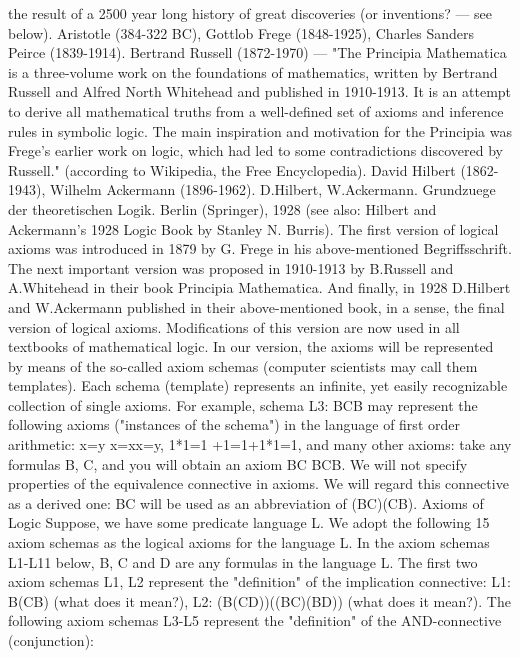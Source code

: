 the result of a 2500 year long history of great discoveries (or inventions? --- see below).
Aristotle (384-322 BC), Gottlob Frege (1848-1925), Charles Sanders Peirce (1839-1914).
Bertrand Russell (1872-1970) --- "The Principia Mathematica is a three-volume work on the foundations of mathematics,
written by Bertrand Russell and Alfred North Whitehead and published in 1910-1913. It is an attempt to derive all
mathematical truths from a well-defined set of axioms and inference rules in symbolic logic. The main inspiration and
motivation for the Principia was Frege's earlier work on logic, which had led to some contradictions discovered by Russell."
(according to Wikipedia, the Free Encyclopedia).
David Hilbert (1862-1943), Wilhelm Ackermann (1896-1962).
D.Hilbert, W.Ackermann. Grundzuege der theoretischen Logik. Berlin (Springer), 1928 (see also: Hilbert and Ackermann's
1928 Logic Book by Stanley N. Burris).
The first version of logical axioms was introduced in 1879 by G. Frege in his above-mentioned
Begriffsschrift. The next important version was proposed in 1910-1913 by B.Russell and A.Whitehead in
their book Principia Mathematica. And finally, in 1928 D.Hilbert and W.Ackermann published in their
above-mentioned book, in a sense, the final version of logical axioms. Modifications of this version are
now used in all textbooks of mathematical logic.
In our version, the axioms will be represented by means of the so-called axiom schemas (computer
scientists may call them templates). Each schema (template) represents an infinite, yet easily recognizable
collection of single axioms. For example, schema L3: B\AND C\IMPLIES B may represent the following axioms
("instances of the schema") in the language of first order arithmetic:
x=y \AND  x=x\IMPLIES x=y,
1*1=1 +1=1+1*1=1,
and many other axioms: take any formulas B, C, and you will obtain an axiom B\AND C B\AND C\IMPLIES B.
We will not specify properties of the equivalence connective in axioms. We will regard this connective as
a derived one: B\IFF C will be used as an abbreviation of (B\IMPLIES C)\AND (C\IMPLIES B).
Axioms of Logic
Suppose, we have some predicate language L. We adopt the following 15 axiom schemas as the logical
axioms for the language L.
In the axiom schemas L1-L11 below, B, C and D are any formulas in the language L.
The first two axiom schemas L1, L2 represent the "definition" of the implication connective:
L1: B\IMPLIES (C\IMPLIES B) (what does it mean?),
L2: (B\IMPLIES (C\IMPLIES D))\IMPLIES ((B\IMPLIES C)\IMPLIES (B\IMPLIES D)) (what does it mean?).
The following axiom schemas L3-L5 represent the "definition" of the AND-connective (conjunction):
